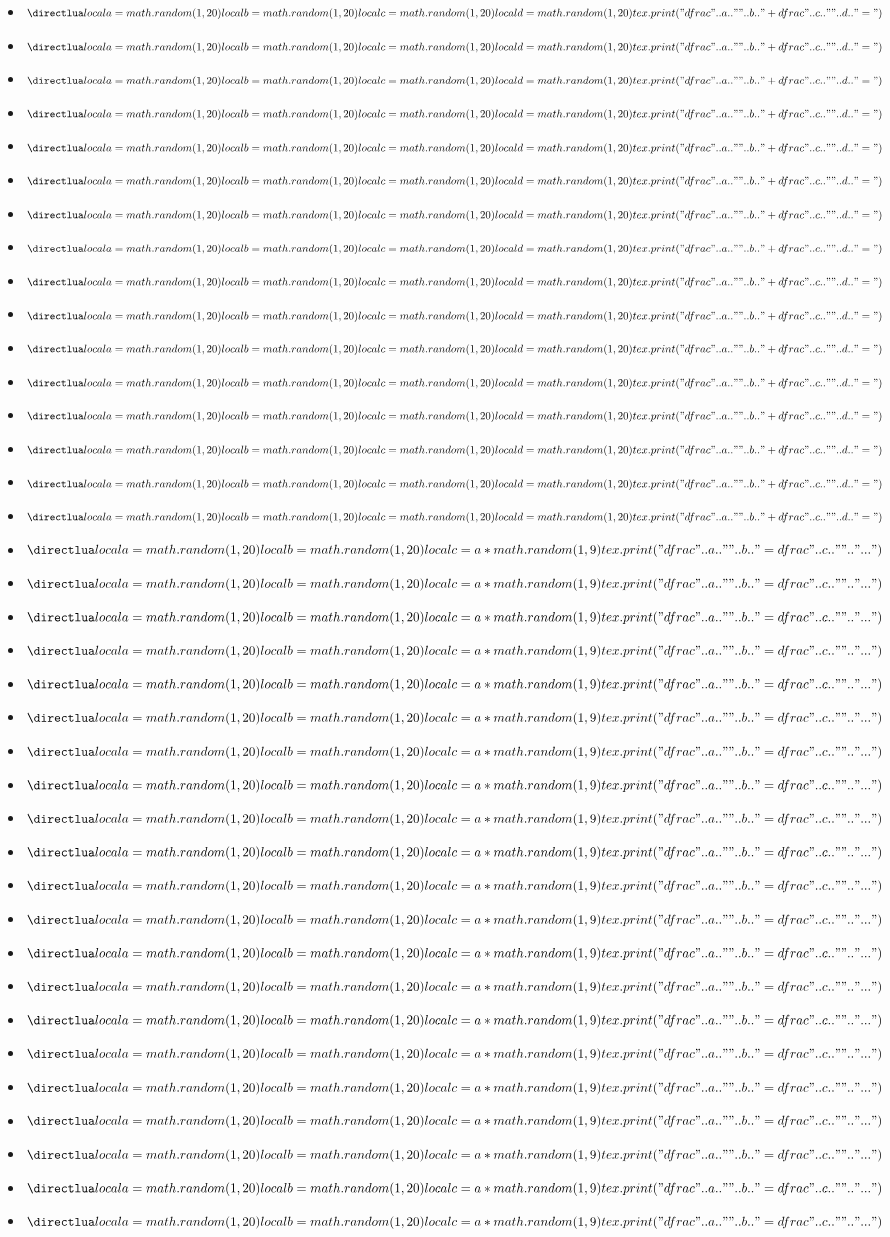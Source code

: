 \documentclass["../Cours.tex"]{subfiles}
\begin{document}
\clearpage
\setlength{\itemsep}{3em}
\begin{multicols}{2}
\begin{itemize}
    \item $\frandom$
    \item $\frandom$
    \item $\frandom$
    \item $\frandom$
    \item $\frandom$
    \item $\frandom$
    \item $\frandom$
    \item $\frandom$
    \item $\frandom$
    \item $\frandom$
    \item $\frandom$
    \item $\frandom$
    \item $\frandom$
    \item $\frandom$
    \item $\frandom$
    \item $\frandom$
\end{itemize}
\end{multicols}

\vspace{0.5cm}

\begin{multicols}{3}
\begin{itemize}
    \item $\trandom$
    \item $\trandom$
    \item $\trandom$
    \item $\trandom$
    \item $\trandom$
    \item $\trandom$
    \item $\trandom$
    \item $\trandom$
    \item $\trandom$
    \item $\trandom$
    \item $\trandom$
    \item $\trandom$
    \item $\trandom$
    \item $\trandom$
    \item $\trandom$
    \item $\trandom$
    \item $\trandom$
    \item $\trandom$
    \item $\trandom$
    \item $\trandom$
    \item $\trandom$
\end{itemize}
\end{multicols}
\end{document}
